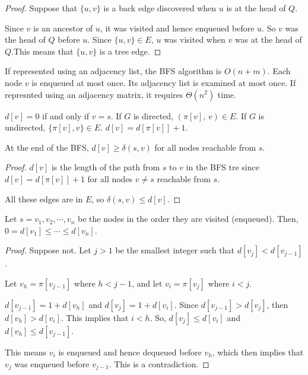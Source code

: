 \begin{proof}
    Suppose that $\{u,v\}$ is a back edge discovered when $u$ is at the head of $Q$.

    Since $v$ is an ancestor of $u$, it was visited and hence enqueued before $u$. So $v$ was the head of $Q$ before $u$. Since $\{u,v\} \in E$, $u$ was visited when $v$ was at the head of $Q$.This means that $\{u,v\}$ is a tree edge.
\end{proof}

If represented using an adjacency list, the BFS algorithm is $O(n+m)$. Each node $v$ is enqueued at most once. Its adjacency list is examined at most once. If represnted using an adjacency matrix, it requires $\Theta(n^2)$ time.

$d[v]=0$ if and only if $v=s$. If $G$ is directed, $(\pi[v],\, v) \in E$. If $G$ is undirected, $\{ \pi[v], v \} \in E$. $d[v] = d[\pi[v]]+1$.

\begin{lemma}
    At the end of the BFS, $d[v] \geq \delta(s,v)$ for all nodes reachable from $s$.
\end{lemma}

\begin{proof}
    $d[v]$ is the length of the path from $s$ to $v$ in the BFS tre since $d[v] = d[\pi[v]] + 1$ for all nodes $v \neq s$ reachable from $s$.

    All these edges are in $E$, so $\delta(s,v) \leq d[v]$.
\end{proof}

\begin{lemma}
    Let $s=v_1,v_2,\cdots,v_n$ be the nodes in the order they are visited (enqueued). Then, $0=d[v_1] \leq \cdots \leq d[v_n]$. 
\end{lemma}

\begin{proof}
    Suppose not. Let $j>1$ be the smallest integer such that $d[v_j]<d[v_{j-1}]$.
    
    Let $v_h = \pi[v_{j-1}]$ where $h < j-1$, and let $v_i = \pi[v_j]$ where $i < j$.
    
    $d[v_{j-1}] = 1 + d[v_{h}]$ and $d[v_j] = 1 + d[v_i]$. Since $d[v_{j-1}] > d[v_j]$, then $d[v_h] > d[v_i]$. This implies that $i<h$. So, $d[v_j] \leq d[v_i]$ and $d[v_h] \leq d[v_{j-1}]$.

    This means $v_i$ is enqueued and hence dequeued before $v_h$, which then implies that $v_j$ was enqueued before $v_{j-1}$. This is a contradiction.
\end{proof}


